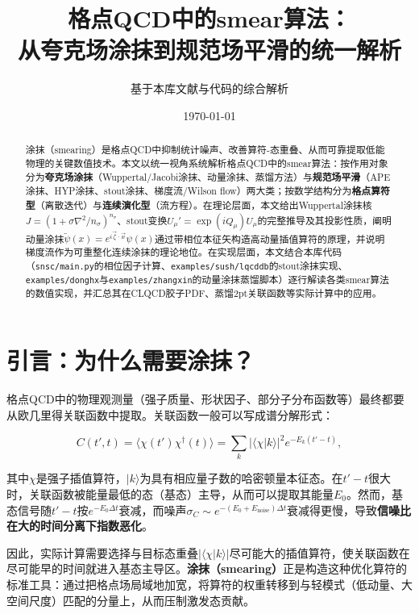 \documentclass[12pt,a4paper]{ctexart}
\title{\heiti 格点QCD中的smear算法：\\
从夸克场涂抹到规范场平滑的统一解析}
\author{基于本库文献与代码的综合解析}
\date{\today}
\theoremstyle{definition}
\begin{document}
\maketitle

\begin{abstract}
\noindent
涂抹（smearing）是格点QCD中抑制统计噪声、改善算符-态重叠、从而可靠提取低能物理的关键数值技术。本文以统一视角系统解析格点QCD中的smear算法：按作用对象分为\textbf{夸克场涂抹}（Wuppertal/Jacobi涂抹、动量涂抹、蒸馏方法）与\textbf{规范场平滑}（APE涂抹、HYP涂抹、stout涂抹、梯度流/Wilson flow）两大类；按数学结构分为\textbf{格点算符型}（离散迭代）与\textbf{连续演化型}（流方程）。在理论层面，本文给出Wuppertal涂抹核$J = (1+\sigma\nabla^2/n_\sigma)^{n_\sigma}$、stout变换$U_\mu' = \exp(iQ_\mu)U_\mu$的完整推导及其投影性质，阐明动量涂抹$\tilde\psi(x) = e^{i\vec{\zeta}\cdot\vec{x}}\psi(x)$通过带相位本征矢构造高动量插值算符的原理，并说明梯度流作为可重整化连续涂抹的理论地位。在实现层面，本文结合本库代码（\texttt{snsc/main.py}的相位因子计算、\texttt{examples/sush/lqcddb}的stout涂抹实现、\texttt{examples/donghx}与\texttt{examples/zhangxin}的动量涂抹蒸馏脚本）逐行解读各类smear算法的数值实现，并汇总其在CLQCD胶子PDF、蒸馏2pt关联函数等实际计算中的应用。
\end{abstract}

\tableofcontents
\newpage

\section{引言：为什么需要涂抹？}

格点QCD中的物理观测量（强子质量、形状因子、部分子分布函数等）最终都要从欧几里得关联函数中提取。关联函数一般可以写成谱分解形式\cite{Peardon2009}：

\begin{equation}
C(t', t) = \langle \chi(t') \chi^\dagger(t) \rangle = \sum_k \left|\langle \chi | k \rangle\right|^2 e^{-E_k (t'-t)},
\label{eq:correlator}
\end{equation}

其中$\chi$是强子插值算符，$|k\rangle$为具有相应量子数的哈密顿量本征态。在$t'-t$很大时，关联函数被能量最低的态（基态）主导，从而可以提取其能量$E_0$。然而，基态信号随$t'-t$按$e^{-E_0\Delta t}$衰减，而噪声$\sigma_C \sim e^{-(E_0+E_{\text{noise}})\Delta t}$衰减得更慢，导致\textbf{信噪比在大的时间分离下指数恶化}。

因此，实际计算需要选择与目标态重叠$|\langle\chi|k\rangle|$尽可能大的插值算符，使关联函数在尽可能早的时间就进入基态主导区。\textbf{涂抹（smearing）}正是构造这种优化算符的标准工具\cite{UKQCD1993}：通过把格点场局域地加宽，将算符的权重转移到与轻模式（低动量、大空间尺度）匹配的分量上，从而压制激发态贡献。
\end{document}
